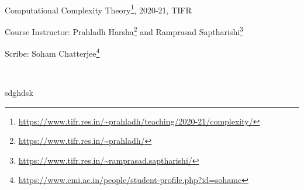 \documentclass{report}
\begin{document}
	
\ 
\thispagestyle{empty}
\vfill
\begin{center}
	\huge{Computational Complexity Theory\footnote{\url{https://www.tifr.res.in/~prahladh/teaching/2020-21/complexity/}}, 2020-21, TIFR}\vspace*{5mm}
	
	\LARGE{Course Instructor: Prahladh Harsha\footnote{\url{https://www.tifr.res.in/~prahladh/}} and Ramprasad Saptharishi\footnote{\url{https://www.tifr.res.in/~ramprasad.saptharishi/}}}\vspace*{5mm}
	
	\LARGE{Scribe: Soham Chatterjee\footnote{\url{https://www.cmi.ac.in/people/student-profile.php?id=sohamc}}}
\end{center}
\vfill
\ 
\pagebreak

sdghdsk
\end{document}
